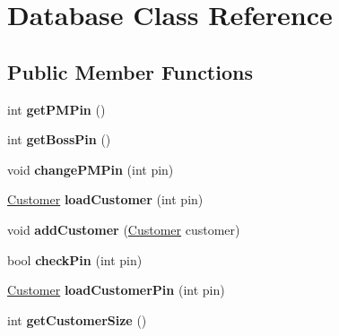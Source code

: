\hypertarget{classDatabase}{}\section{Database Class Reference}
\label{classDatabase}
\subsection*{Public Member Functions}
\begin{DoxyCompactItemize}
\item 
int {\bfseries get\+P\+M\+Pin} ()\hypertarget{classDatabase_a2f14c252c25a8c19bdb960f5890c4863}{}\label{classDatabase_a2f14c252c25a8c19bdb960f5890c4863}

\item 
int {\bfseries get\+Boss\+Pin} ()\hypertarget{classDatabase_af38c09e944a2511a983787497db1238a}{}\label{classDatabase_af38c09e944a2511a983787497db1238a}

\item 
void {\bfseries change\+P\+M\+Pin} (int pin)\hypertarget{classDatabase_a17c9ecb9cf21244d5b7b1ba0c816ff3b}{}\label{classDatabase_a17c9ecb9cf21244d5b7b1ba0c816ff3b}

\item 
\hyperlink{classCustomer}{Customer} {\bfseries load\+Customer} (int pin)\hypertarget{classDatabase_a246fc85e016526146820912fbd1b5a7a}{}\label{classDatabase_a246fc85e016526146820912fbd1b5a7a}

\item 
void {\bfseries add\+Customer} (\hyperlink{classCustomer}{Customer} customer)\hypertarget{classDatabase_a2afca0cc455a5c12ae2905a8900012e8}{}\label{classDatabase_a2afca0cc455a5c12ae2905a8900012e8}

\item 
bool {\bfseries check\+Pin} (int pin)\hypertarget{classDatabase_a30f198c1fca9a5a9dc4931740a2362a9}{}\label{classDatabase_a30f198c1fca9a5a9dc4931740a2362a9}

\item 
\hyperlink{classCustomer}{Customer} {\bfseries load\+Customer\+Pin} (int pin)\hypertarget{classDatabase_a8152db1c1e7f204ae8a5176f87641478}{}\label{classDatabase_a8152db1c1e7f204ae8a5176f87641478}

\item 
int {\bfseries get\+Customer\+Size} ()\hypertarget{classDatabase_a42fdd4aec54f0345304a6eb97f3ea887}{}\label{classDatabase_a42fdd4aec54f0345304a6eb97f3ea887}


\end{DoxyCompactItemize}
